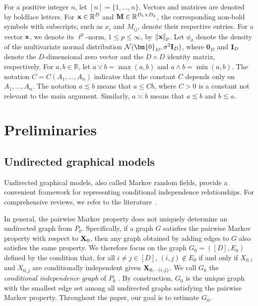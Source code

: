 \documentclass[11pt,a4paper,final]{article}
\numberwithin{equation}{section}
\theoremstyle{remark}
\def\cN{\mathcal N}
\newcommand{\bI}{{\bf I}}
\newcommand{\bM}{{\bf M}}
\newcommand{\bx}{{\bf x}}
\newcommand{\bX}{{\bf X}}
\newcommand{\bbR}{{\mathbb R}}
\newcommand{\bean}{\setlength\arraycolsep{1pt}\begin{eqnarray*}}
\newcommand{\eean}{\end{eqnarray*}}
\def\indep{ \!\perp\!\!\!\perp }
\begin{document}
For a positive integer $n$, let $[n] = \{1, \ldots, n\}$. Vectors and matrices are denoted by boldface letters. For $\bx \in \bbR^D$ and $\bM \in \bbR^{D_1 \times D_2}$, the corresponding non-bold symbols with subscripts, such as $x_i$ and $M_{ij}$, denote their respective entries.
For a vector $\bx$, we denote its $\ell^p$-norm, $1 \le p \le \infty$, by $\|\bx\|_p$. 
Let $\phi_{\sigma}$ denote the density of the multivariate normal distribution $\cN(\bm{0}_D, \sigma^2 \bI_D)$, where $\bm{0}_D$ and $\bI_D$ denote the $D$-dimensional zero vector and the $D \times D$ identity matrix, respectively. For $a,b \in \bbR$, let $a \vee b = \max(a,b)$ and $a \wedge b = \min (a,b)$. The notation $C = C(A_1, \ldots, A_n)$ indicates that the constant $C$ depends only on $A_1, \ldots, A_n$. 
The notation $a \lesssim b$ means that $a \leq C b$, where $C > 0$ is a constant not relevant to the main argument.
Similarly, $a \asymp b$ means that $a \lesssim b$ and $b \lesssim a$.






\section{Preliminaries} \label{sec:preliminary}


\subsection{Undirected graphical models}
\label{ssec:prelim_graph}

Undirected graphical models, also called Markov random fields, provide a convenient framework for representing conditional independence relationships.
For comprehensive reviews, we refer to the literature~\citep{lauritzen1996graphical, koller2009probabilistic, drton2017structure}.

In general, the pairwise Markov property does not uniquely determine an undirected graph from $P_0$.
Specifically, if a graph $G$ satisfies the pairwise Markov property with respect to $\bX_0$, then any graph obtained by adding edges to $G$ also satisfies the same property.
We therefore focus on the graph $G_0 = ([D], E_0)$ defined by the condition that, for all $i \neq j \in [D]$, $(i,j) \notin E_{0}$ if and only if $X_{0,i}$ and $X_{0,j}$ are conditionally independent given $\bX_{0,-(i,j)}$.
We call $G_{0}$ the \textit{conditional independence graph} of $P_{0}$ \citep{drton2017structure}.
By construction, $G_0$ is the unique graph with the smallest edge set among all undirected graphs satisfying the pairwise Markov property.
Throughout the paper, our goal is to estimate $G_0$.
\end{document}
